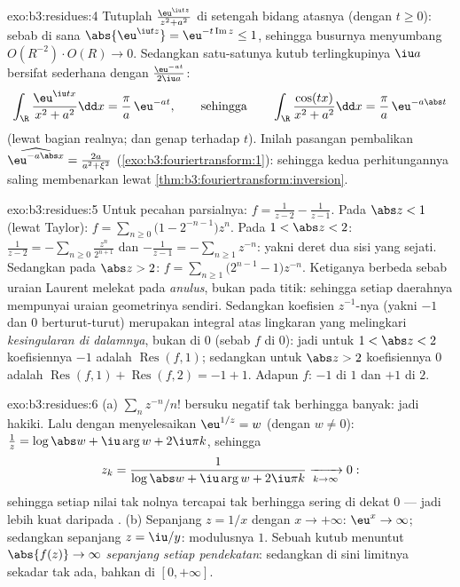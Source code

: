 \begin{solution}{exo:b3:residues:4}
Tutuplah $\frac{\eu^{\iu tz}}{z^2 + a^2}$ di setengah bidang atasnya
(dengan $t \geq 0$): sebab di sana $\abs{\eu^{\iu tz}} =
\eu^{-t\operatorname{Im}z} \leq 1$, sehingga busurnya menyumbang
$O(R^{-2})\cdot O(R) \to 0$. Sedangkan satu-satunya kutub terlingkupinya $\iu a$
bersifat sederhana dengan  $\frac{\eu^{-at}}{2\iu a}$:
\[
\int_\R\frac{\eu^{\iu tx}}{x^2 + a^2}\dd x =
\frac{\pi}{a}\,\eu^{-at},
\qquad\text{sehingga}\qquad
\int_\R\frac{\cos(tx)}{x^2+a^2}\dd x = \frac\pi
a\,\eu^{-a\abs t}
\]
(lewat bagian realnya; dan genap terhadap $t$). Inilah pasangan pembalikan
$\widehat{\eu^{-a\abs x}} = \frac{2a}{a^2+\xi^2}$
(\cref{exo:b3:fouriertransform:1}): sehingga kedua perhitungannya
saling membenarkan lewat
\cref{thm:b3:fouriertransform:inversion}.
\end{solution}

\begin{solution}{exo:b3:residues:5}
Untuk pecahan parsialnya: $f = \frac1{z-2} - \frac1{z-1}$.
Pada $\abs z < 1$ (lewat Taylor):
$f = \sum_{n\geq0}\bigl(1 - 2^{-n-1}\bigr)z^n$.
Pada $1 < \abs z < 2$: $\frac1{z-2} =
-\sum_{n\geq0}\frac{z^n}{2^{n+1}}$ dan $-\frac1{z-1} =
-\sum_{n\geq1}z^{-n}$: yakni deret dua sisi yang sejati.
Sedangkan pada $\abs z > 2$: $f = \sum_{n\geq1}\bigl(2^{n-1} -
1\bigr)z^{-n}$. Ketiganya berbeda sebab uraian Laurent
melekat pada \emph{anulus}, bukan pada titik: sehingga setiap daerahnya mempunyai
uraian geometrinya sendiri. Sedangkan koefisien $z^{-1}$-nya (yakni $-1$ dan
$0$ berturut-turut) merupakan integral atas lingkaran yang melingkari
\emph{kesingularan di dalamnya}, bukan  di $0$ (sebab $f$
 di $0$): jadi untuk $1 < \abs z < 2$ koefisiennya
$-1$ adalah $\operatorname{Res}(f, 1)$; sedangkan untuk $\abs z > 2$
koefisiennya $0$ adalah $\operatorname{Res}(f,1) +
\operatorname{Res}(f,2) = -1 + 1$. Adapun  $f$: $-1$
di $1$ dan $+1$ di $2$.
\end{solution}

\begin{solution}{exo:b3:residues:6}
(a)  $\sum_nz^{-n}/n!$ bersuku negatif tak
berhingga banyak: jadi hakiki. Lalu dengan menyelesaikan $\eu^{1/z} = w$ (dengan $w \neq
0$): $\frac1z = \log\abs w + \iu\arg w + 2\iu\pi k$, sehingga
\[
z_k = \frac1{\log\abs w + \iu\arg w + 2\iu\pi k}
\xrightarrow[k\to\infty]{} 0 :
\]
sehingga setiap nilai tak nolnya tercapai tak berhingga sering di dekat $0$ ---
jadi lebih kuat daripada .
(b) Sepanjang $z = 1/x$ dengan $x \to +\infty$: $\eu^x \to \infty$;
sedangkan sepanjang $z = \iu/y$: modulusnya $1$. Sebuah kutub menuntut
$\abs{f(z)} \to \infty$ \emph{sepanjang setiap pendekatan}: sedangkan di sini
limitnya sekadar tak ada, bahkan di $[0, +\infty]$.
\end{solution}

